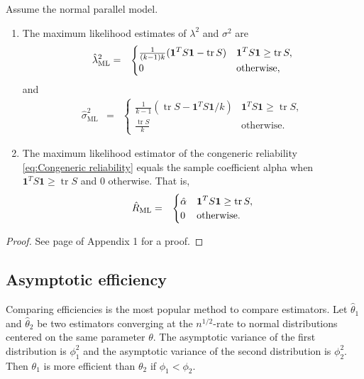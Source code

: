 \documentclass[twoside]{article}
\DeclareMathOperator{\tr}{tr}
\begin{document}
\begin{thm}\label{thm:ML}
Assume the normal parallel model.
\begin{enumerate}[label=(\roman*)]
\item The maximum likelihood estimates of $\lambda^{2}$
and $\sigma^{2}$ are 
\begin{eqnarray*}
\hat{\lambda}^2_\textrm{ML} & = & \begin{cases}
\frac{1}{(k-1)k}(\boldsymbol{1}^{T}S\boldsymbol{1}-\tr{S}) & \boldsymbol{1}^{T}S\boldsymbol{1}\geq\tr{S},\\
0 & \text{\textrm{otherwise}},
\end{cases}\\
\end{eqnarray*}
and
\begin{eqnarray*}
\hat{\sigma}^2_\textrm{ML} & = & \begin{cases}
\frac{1}{k-1}(\tr{S}-\boldsymbol{1}^{T}S\boldsymbol{1}/k) & \boldsymbol{1}^{T}S\boldsymbol{1}\geq\tr{S},\\
\frac{\tr{S}}{k} & \textrm{otherwise}.
\end{cases}
\end{eqnarray*}
\item The maximum likelihood estimator of the congeneric reliability
\eqref{eq:Congeneric reliability} equals the sample coefficient alpha
when $\boldsymbol{1}^{T}S\boldsymbol{1}\geq\tr{S}$ and $0$ otherwise. That is,
\begin{eqnarray*}
\hat{ R}_\textrm{ML} & = & \begin{cases}
\hat{\alpha} & \boldsymbol{1}^{T}S\boldsymbol{1}\geq\tr{S},\\
0 & \text{\textrm{otherwise}}.
\end{cases}
\end{eqnarray*}
\end{enumerate}
\end{thm}
\begin{proof}
See page \pageref{proof:ML} of Appendix 1 for a proof. 
\end{proof}

\subsection{Asymptotic efficiency}
Comparing efficiencies is the most popular method to compare estimators. Let $\hat{\theta}_1$ and $\hat{\theta}_2$ be two estimators converging at the $n^{1/2}$-rate to normal distributions centered on the same parameter $\theta$. The asymptotic variance of the first distribution is $\phi_1^2$ and the asymptotic variance of the second distribution is $\phi_2^2$. Then $\theta_1$ is more efficient than $\theta_2$ if $\phi_1<\phi_2$. 
\end{document}
